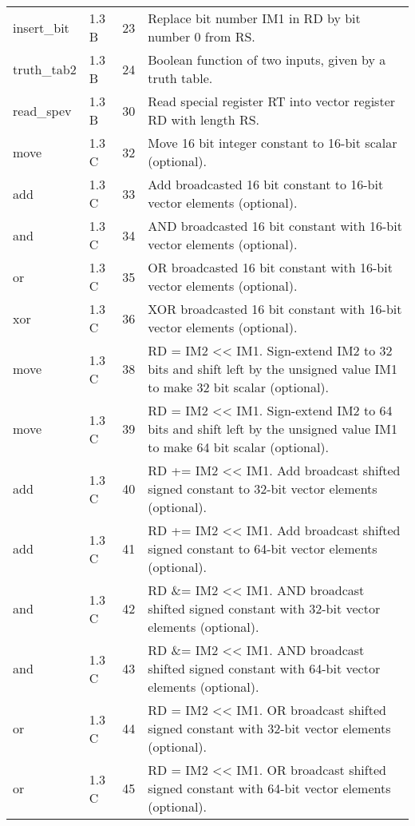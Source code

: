 \documentclass[forwardcom.tex]{subfiles}
\begin{document}
\begin{longtable} {|p{20mm}|p{10mm}|p{8mm}|p{75mm}|}
insert\_bit   & 1.3 B & 23 & Replace bit number IM1 in RD by bit number 0 from RS. \\

truth\_tab2   & 1.3 B & 24 & Boolean function of two inputs, given by a truth table. \\
read\_spev    & 1.3 B & 30 & Read special register RT into vector register RD with  length RS. \\
move          & 1.3 C & 32 & Move 16 bit integer constant to 16-bit scalar (optional). \\
add           & 1.3 C & 33 & Add broadcasted 16 bit constant to 16-bit vector elements (optional). \\
and           & 1.3 C & 34 & AND broadcasted 16 bit constant with 16-bit vector elements (optional). \\
or            & 1.3 C & 35 & OR broadcasted 16 bit constant with 16-bit vector elements (optional). \\
xor           & 1.3 C & 36 & XOR broadcasted 16 bit constant with 16-bit vector elements (optional). \\
move          & 1.3 C & 38 & RD = IM2 \textless\textless{} IM1. Sign-extend IM2 to 32 bits and shift left by the unsigned value IM1 to make 32 bit scalar (optional). \\
move          & 1.3 C & 39 & RD = IM2 \textless\textless{} IM1. Sign-extend IM2 to 64 bits and shift left by the unsigned value IM1 to make 64 bit scalar (optional). \\
add           & 1.3 C & 40 & RD += IM2 \textless\textless{} IM1. Add broadcast shifted signed constant to 32-bit vector elements (optional). \\
add           & 1.3 C & 41 & RD += IM2 \textless\textless{} IM1. Add broadcast shifted signed constant to 64-bit vector elements (optional). \\
and           & 1.3 C & 42 & RD \&= IM2 \textless\textless{} IM1. AND broadcast shifted signed constant with 32-bit vector elements (optional). \\
and           & 1.3 C & 43 & RD \&= IM2 \textless\textless{} IM1. AND broadcast shifted signed constant with 64-bit vector elements (optional). \\
or            & 1.3 C & 44 & RD \textbar{}= IM2 \textless\textless{} IM1. OR broadcast shifted signed constant with 32-bit vector elements (optional). \\
or            & 1.3 C & 45 & RD \textbar{}= IM2 \textless\textless{} IM1. OR broadcast shifted signed constant with 64-bit vector elements (optional). \\

\end{longtable}
\end{document}
